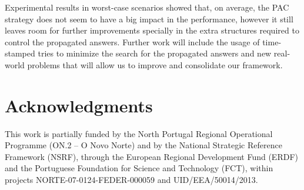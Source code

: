 \documentclass{llncs}
\begin{document}
Experimental results in worst-case scenarios showed that, on average,
the PAC strategy does not seem to have a big impact in the
performance, however it still leaves room for further improvements
specially in the extra structures required to control the propagated
answers. Further work will include the usage of time-stamped tries to
minimize the search for the propagated answers and new real-world
problems that will allow us to improve and consolidate our framework.


\section*{Acknowledgments}

This work is partially funded by the North Portugal Regional
Operational Programme (ON.2 – O Novo Norte) and by the National
Strategic Reference Framework (NSRF), through the European Regional
Development Fund (ERDF) and the Portuguese Foundation for Science and
Technology (FCT), within projects NORTE-07-0124-FEDER-000059 and
UID/EEA/50014/2013.





\end{document}
